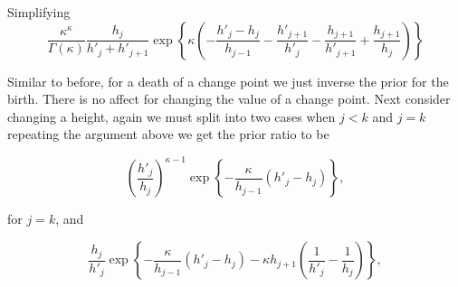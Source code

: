 \documentclass[../main.tex]{subfiles}
\begin{document}
Simplifying 
\begin{equation}
\frac{\kappa^\kappa}{\Gamma \left( \kappa \right)} \frac{h_j}{h'_j + h'_{j+1}} \exp \left\{ \kappa \left( -\frac{h'_j - h_j}{h_{j-1}} - \frac{h'_{j+1}}{h'_j} - \frac{h_{j+1}}{h'_{j+1}} 
+\frac{h_{j+1}}{h_j} \right)   \right\}
\end{equation}


Similar to before, for a death of a change point we just inverse the prior for the birth. There is no affect for changing the value of a change point. Next consider changing a height, again we must split into two cases when $j<k$ and $j=k$ repeating the argument above we get the prior ratio to be 

%
 
 \begin{equation}
\left( \frac{h'_j}{h_j} \right )^{\kappa-1} \exp \left\{ - \frac{\kappa}{h_{j-1}} \left( h'_j - h_j \right) \right\},
\end{equation}

for $j=k$, and
 
%
 \begin{equation}
 \frac{h_j}{h'_j}  \exp \left\{ -\frac{\kappa}{h_{j-1}} \left(h'_j - h_j \right) - \kappa h_{j+1} \left( \frac{1}{h'_j} - \frac{1}{h_j} \right)\right\},
\end{equation}
\end{document}
